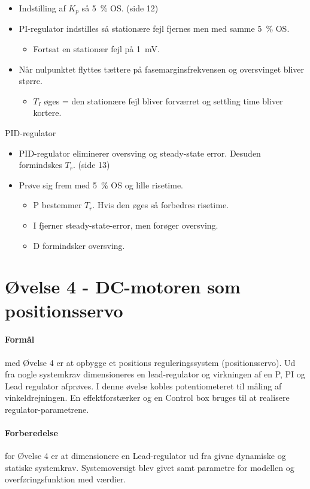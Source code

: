 \documentclass[danish]{article}
\begin{document}
\begin{itemize}
	\item Indstilling af $K_p$ så \SI{5}{\percent} OS. (side 12)
	\item PI-regulator indstilles så stationære fejl fjernes men med samme \SI{5}{\percent} OS.
	\begin{itemize}
		\item Fortsat en stationær fejl på \SI{1}{\milli\volt}.
	\end{itemize}
	\item Når nulpunktet flyttes tættere på fasemarginsfrekvensen og oversvinget bliver større.
	\begin{itemize}
		\item $T_I$ øges = den stationære fejl bliver forværret og settling time bliver kortere.
	\end{itemize} 
\end{itemize}
\vspace{3mm}
PID-regulator
\begin{itemize}
	\item PID-regulator eliminerer oversving og steady-state error. Desuden formindskes $T_r$. (side 13)
	\item Prøve sig frem med \SI{5}{\percent} OS og lille risetime. 
\begin{itemize}
	\item P bestemmer $T_r$. Hvis den øges så forbedres risetime.
	\item I fjerner steady-state-error, men forøger oversving.
 	\item D formindsker oversving.
\end{itemize}
\end{itemize}

\newpage
\section{Øvelse 4 - DC-motoren som positionsservo}
\paragraph{Formål} med Øvelse 4 er at opbygge et positions reguleringssystem (positionsservo). Ud fra nogle systemkrav dimensioneres en lead-regulator og virkningen af en P, PI og Lead regulator afprøves. I denne øvelse kobles potentiometeret til måling af vinkeldrejningen. En effektforstærker og en Control box bruges til at realisere regulator-parametrene.


\paragraph{Forberedelse} for Øvelse 4 er at dimensionere en Lead-regulator ud fra givne dynamiske og statiske systemkrav. Systemoversigt blev givet samt parametre for modellen og overføringsfunktion med værdier.
\end{document}

